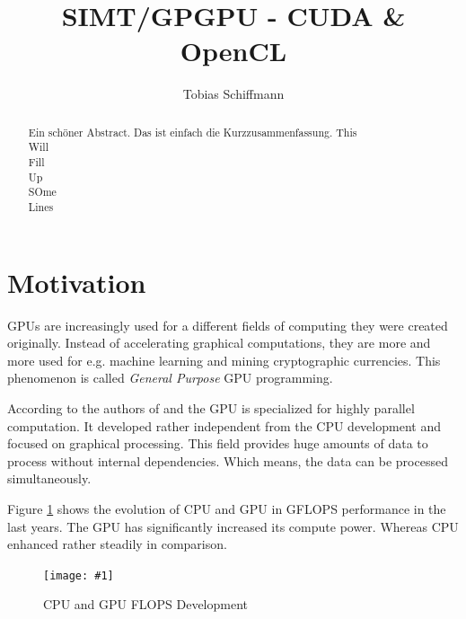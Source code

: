 \documentclass[a4paper,12pt]{llncs}
\numberwithin{equation}{section}
\newcommand{\bildbreite}[5]{
  \begin{figure}[htbp]
    \begin{center}
      \texttt{[image: \#1]}
      \caption[#5]{#4}
      \label{#3}
    \end{center}
  \end{figure}
}
\begin{document}


\author{Tobias Schiffmann}

\title{SIMT/GPGPU - CUDA \& OpenCL}

\maketitle

\thispagestyle{empty}

\begin{abstract}
Ein schöner Abstract. Das ist einfach die Kurzzusammenfassung.
This \\
Will\\
Fill\\
Up\\
SOme\\
Lines\\
\end{abstract}


\section{Motivation}
  GPUs are increasingly used for a different fields of computing they were created originally.
  Instead of accelerating graphical computations, they are more and more used for e.g. machine learning and mining cryptographic currencies.
  This phenomenon is called \textit{General Purpose} GPU programming.~\cite{8363085}~\cite{Owens.2008}
  
    According to the authors of \cite{NVIDIA.2019} and \cite{Rauber.2012} the GPU is specialized for highly parallel computation.
    It developed rather independent from the CPU development and focused on graphical processing.
    This field provides huge amounts of data to process without internal dependencies.
    Which means, the data can be processed simultaneously.
     
    Figure \ref{fig:GPU_CPU} shows the evolution of CPU and GPU in GFLOPS performance in the last years.
  The GPU has significantly increased its compute power.
  Whereas CPU enhanced rather steadily in comparison.
   \bildbreite{figures/GPU_CPU_Flops.JPG}{14cm}{fig:GPU_CPU}{CPU and GPU FLOPS Development~\cite{NVIDIA.2019}}{}
  
\end{document}
